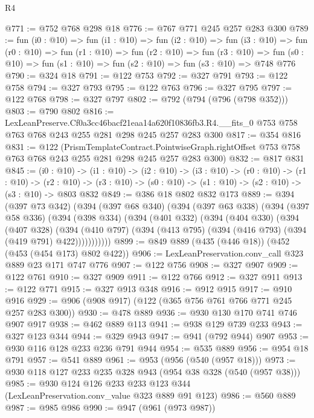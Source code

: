 \begin{lexlean}{R4}
\begin{coremodule}
@771 := @752 @768 @298 @18
@776 := @767 @771 @245 @257 @283 @300
@789 := fun (i0 : @10) =>
  fun (i1 : @10) =>
  fun (i2 : @10) =>
  fun (i3 : @10) =>
  fun (r0 : @10) =>
  fun (r1 : @10) =>
  fun (r2 : @10) =>
  fun (r3 : @10) =>
  fun (s0 : @10) => fun (s1 : @10) => fun (s2 : @10) => fun (s3 : @10) => @748 @776
@790 := @324 @18
@791 := @122 @753
@792 := @327 @791
@793 := @122 @758
@794 := @327 @793
@795 := @122 @763
@796 := @327 @795
@797 := @122 @768
@798 := @327 @797
@802 := @792 (@794 (@796 (@798 @352)))
@803 := @790 @802
@816 := LexLeanPreserve.Cf0a3cc46bacf21eaa14a620f10836fb3.R4.__fits_0
    @753
    @758
    @763
    @768
    @243
    @255
    @281
    @298
    @245
    @257
    @283
    @300
@817 := @354 @816
@831 := @122
    (PrismTemplateContract.PointwiseGraph.rightOffset
      @753
      @758
      @763
      @768
      @243
      @255
      @281
      @298
      @245
      @257
      @283
      @300)
@832 := @817 @831
@845 := (i0 : @10) ->
  (i1 : @10) ->
  (i2 : @10) ->
  (i3 : @10) ->
  (r0 : @10) ->
  (r1 : @10) ->
  (r2 : @10) -> (r3 : @10) -> (s0 : @10) -> (s1 : @10) -> (s2 : @10) -> (s3 : @10) -> @803 @832
@849 := @386 @18 @802 @832 @173
@889 := @394
    (@397 @73 @342)
    (@394
      (@397 @68 @340)
      (@394
        (@397 @63 @338)
        (@394
          (@397 @58 @336)
          (@394
            (@398 @334)
            (@394
              (@401 @332)
              (@394
                (@404 @330)
                (@394
                  (@407 @328)
                  (@394
                    (@410 @797)
                    (@394 (@413 @795) (@394 (@416 @793) (@394 (@419 @791) @422)))))))))))
@899 := @849 @889 (@435 (@446 @18)) (@452 (@453 (@454 @173) @802 @422))
@906 := LexLeanPreservation.conv_call @323 @889 @23 @171 @747 @776
@907 := @122 @756
@908 := @327 @907
@909 := @122 @761
@910 := @327 @909
@911 := @122 @766
@912 := @327 @911
@913 := @122 @771
@915 := @327 @913 @348
@916 := @912 @915
@917 := @910 @916
@929 := @906 (@908 @917) (@122 (@365 @756 @761 @766 @771 @245 @257 @283 @300))
@930 := @478 @889
@936 := @930 @130 @170 @741 @746 @907 @917
@938 := @462 @889 @113
@941 := @938 @129 @739 @233
@943 := @327 @123 @344
@944 := @329 @943
@947 := @941 (@792 @944) @907
@953 := @930 @116 @128 @233 @236 @791 @944
@954 := @535 @889
@956 := @954 @18 @791
@957 := @541 @889
@961 := @953 (@956 (@540 (@957 @18)))
@973 := @930 @118 @127 @233 @235 @328 @943 (@954 @38 @328 (@540 (@957 @38)))
@985 := @930 @124 @126 @233 @233 @123 @344 (LexLeanPreservation.conv_value @323 @889 @91 @123)
@986 := @560 @889
@987 := @985 @986
@990 := @947 (@961 (@973 @987))

\end{coremodule}
\end{lexlean}
